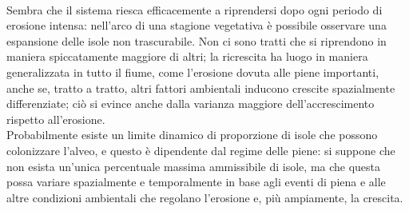 \\
Sembra che il sistema riesca efficacemente a riprendersi dopo ogni periodo di erosione intensa: nell'arco di una stagione vegetativa è possibile osservare una espansione delle isole non trascurabile.
Non ci sono tratti che si riprendono in maniera spiccatamente maggiore di altri; la ricrescita ha luogo in maniera generalizzata in tutto il fiume, come l'erosione dovuta alle piene importanti, anche se, tratto a tratto, altri fattori ambientali inducono crescite spazialmente differenziate; ciò si evince anche dalla varianza maggiore dell'accrescimento rispetto all'erosione.
\\
Probabilmente esiste un limite dinamico di proporzione di isole che possono colonizzare l'alveo, e questo è dipendente dal regime delle piene: si suppone che non esista un'unica percentuale massima ammissibile di isole, ma che questa possa variare spazialmente e temporalmente in base agli eventi di piena e alle altre condizioni ambientali che regolano l'erosione e, più ampiamente, la crescita.

